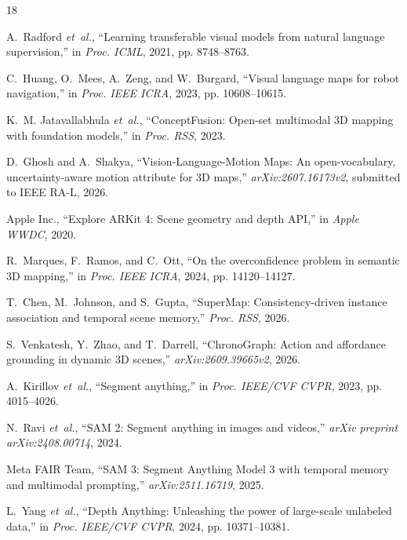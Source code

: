\documentclass[conference]{IEEEtran}
\begin{document}
\begin{thebibliography}{18}\setlength{\itemsep}{0.2pt plus 0.2pt}\setlength{\parsep}{0pt}\footnotesize

A.~Radford \emph{et~al.}, ``Learning transferable visual models from natural language supervision,'' in \emph{Proc. ICML}, 2021, pp. 8748--8763.

C.~Huang, O.~Mees, A.~Zeng, and W.~Burgard, ``Visual language maps for robot navigation,'' in \emph{Proc. IEEE ICRA}, 2023, pp. 10608--10615.

K.~M. Jatavallabhula \emph{et~al.}, ``ConceptFusion: Open-set multimodal 3D mapping with foundation models,'' in \emph{Proc. RSS}, 2023.

D.~Ghosh and A.~Shakya, ``Vision-Language-Motion Maps: An open-vocabulary, uncertainty-aware motion attribute for 3D maps,'' \emph{arXiv:2607.16173v2}, submitted to IEEE RA-L, 2026.

{Apple Inc.}, ``Explore ARKit 4: Scene geometry and depth API,'' in \emph{Apple WWDC}, 2020.

R.~Marques, F.~Ramos, and C.~Ott, ``On the overconfidence problem in semantic 3D mapping,'' in \emph{Proc. IEEE ICRA}, 2024, pp. 14120--14127.

T.~Chen, M.~Johnson, and S.~Gupta, ``SuperMap: Consistency-driven instance association and temporal scene memory,'' \emph{Proc. RSS}, 2026.

S.~Venkatesh, Y.~Zhao, and T.~Darrell, ``ChronoGraph: Action and affordance grounding in dynamic 3D scenes,'' \emph{arXiv:2609.39665v2}, 2026.

A.~Kirillov \emph{et~al.}, ``Segment anything,'' in \emph{Proc. IEEE/CVF CVPR}, 2023, pp. 4015--4026.

N.~Ravi \emph{et~al.}, ``SAM 2: Segment anything in images and videos,'' \emph{arXiv preprint arXiv:2408.00714}, 2024.

{Meta FAIR Team}, ``SAM 3: Segment Anything Model 3 with temporal memory and multimodal prompting,'' \emph{arXiv:2511.16719}, 2025.

L.~Yang \emph{et~al.}, ``Depth Anything: Unleashing the power of large-scale unlabeled data,'' in \emph{Proc. IEEE/CVF CVPR}, 2024, pp. 10371--10381.


\end{thebibliography}
\end{document}
